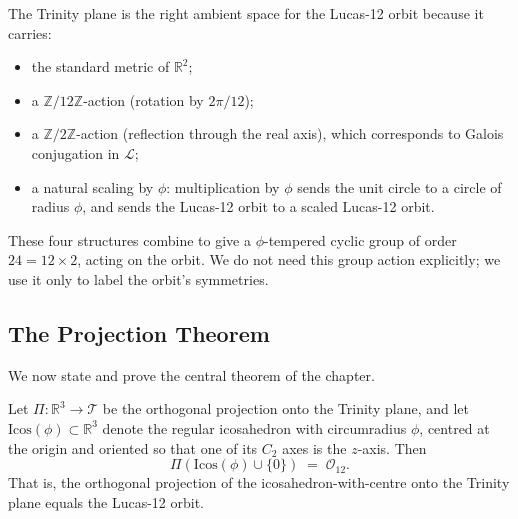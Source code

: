 The Trinity plane is the right ambient space for the Lucas-12 orbit
because it carries:

\begin{itemize}
\item the standard metric of $\mathbb{R}^{2}$;
\item a $\mathbb{Z}/12\mathbb{Z}$-action (rotation by $2\pi / 12$);
\item a $\mathbb{Z}/2\mathbb{Z}$-action (reflection through the
  real axis), which corresponds to Galois conjugation in
  $\mathcal{L}$;
\item a natural scaling by $\phi$: multiplication by $\phi$ sends
  the unit circle to a circle of radius $\phi$, and sends the
  Lucas-12 orbit to a scaled Lucas-12 orbit.
\end{itemize}

These four structures combine to give a $\phi$-tempered cyclic group
of order $24 = 12 \times 2$, acting on the orbit. We do not need
this group action explicitly; we use it only to label the orbit's
symmetries.

\subsection{The Projection Theorem}
\label{sec:13-projection}

We now state and prove the central theorem of the chapter.

\begin{theorem}
\label{thm:13-projection}
Let $\Pi : \mathbb{R}^{3} \to \mathcal{T}$ be the orthogonal
projection onto the Trinity plane, and let
$\mathrm{Icos}(\phi) \subset \mathbb{R}^{3}$ denote the regular
icosahedron with circumradius $\phi$, centred at the origin and
oriented so that one of its $C_{2}$ axes is the $z$-axis. Then
\[
  \Pi(\mathrm{Icos}(\phi) \cup \{0\}) \;=\; \mathcal{O}_{12}.
\]
That is, the orthogonal projection of the icosahedron-with-centre
onto the Trinity plane equals the Lucas-12 orbit.
\end{theorem}

